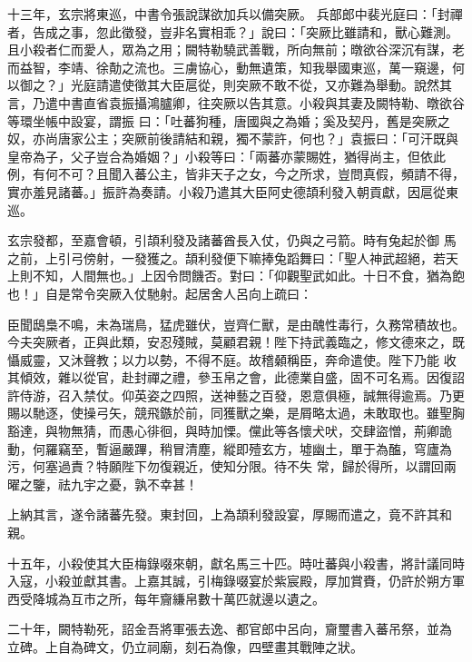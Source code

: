 \begin{pinyinscope}
 十三年，玄宗將東巡，中書令張說謀欲加兵以備突厥。
 兵部郎中裴光庭曰：「封禪者，告成之事，忽此徵發，豈非名實相乖？」說曰：「突厥比雖請和，獸心難測。且小殺者仁而愛人，眾為之用；闕特勒驍武善戰，所向無前；暾欲谷深沉有謀，老而益智，李靖、徐勣之流也。三虜協心，動無遺策，知我舉國東巡，萬一窺邊，何以御之？」光庭請遣使徵其大臣扈從，則突厥不敢不從，又亦難為舉動。說然其言，乃遣中書直省袁振攝鴻臚卿，往突厥以告其意。小殺與其妻及闕特勒、暾欲谷等環坐帳中設宴，謂振
 曰：「吐蕃狗種，唐國與之為婚；奚及契丹，舊是突厥之奴，亦尚唐家公主；突厥前後請結和親，獨不蒙許，何也？」袁振曰：「可汗既與皇帝為子，父子豈合為婚姻？」小殺等曰：「兩蕃亦蒙賜姓，猶得尚主，但依此例，有何不可？且聞入蕃公主，皆非天子之女，今之所求，豈問真假，頻請不得，實亦羞見諸蕃。」振許為奏請。小殺乃遣其大臣阿史德頡利發入朝貢獻，因扈從東巡。



 玄宗發都，至嘉會頓，引頡利發及諸蕃酋長入仗，仍與之弓箭。時有兔起於御
 馬之前，上引弓傍射，一發獲之。頡利發便下嘛捧兔蹈舞曰：「聖人神武超絕，若天上則不知，人間無也。」上因令問饑否。對曰：「仰觀聖武如此。十日不食，猶為飽也！」自是常令突厥入仗馳射。起居舍人呂向上疏曰：



 臣聞鴟梟不鳴，未為瑞鳥，猛虎雖伏，豈齊仁獸，是由醜性毒行，久務常積故也。今夫突厥者，正與此類，安忍殘賊，莫顧君親！陛下持武義臨之，修文德來之，既懾威靈，又沐聲教；以力以勢，不得不庭。故稽顙稱臣，奔命遣使。陛下乃能
 收其傾效，雜以從官，赴封禪之禮，參玉帛之會，此德業自盛，固不可名焉。因復詔許侍游，召入禁仗。仰英姿之四照，送神藝之百發，恩意俱極，誠無得逾焉。乃更賜以馳逐，使操弓矢，競飛鏃於前，同獲獸之樂，是屑略太過，未敢取也。雖聖胸豁達，與物無猜，而愚心徘徊，與時加慄。儻此等各懷犬吠，交肆盜憎，荊卿詭動，何羅竊至，暫逼嚴蹕，稍冒清塵，縱即殪玄方，墟幽土，單于為醢，穹廬為污，何塞過責？特願陛下勿復親近，使知分限。待不失
 常，歸於得所，以謂回兩曜之鑒，祛九宇之憂，孰不幸甚！



 上納其言，遂令諸蕃先發。東封回，上為頡利發設宴，厚賜而遣之，竟不許其和親。



 十五年，小殺使其大臣梅錄啜來朝，獻名馬三十匹。時吐蕃與小殺書，將計議同時入寇，小殺並獻其書。上嘉其誠，引梅錄啜宴於紫宸殿，厚加賞賚，仍許於朔方軍西受降城為互市之所，每年齎縑帛數十萬匹就邊以遺之。



 二十年，闕特勒死，詔金吾將軍張去逸、都官郎中呂向，齎璽書入蕃吊祭，並為
 立碑。上自為碑文，仍立祠廟，刻石為像，四壁畫其戰陣之狀。




\end{pinyinscope}
